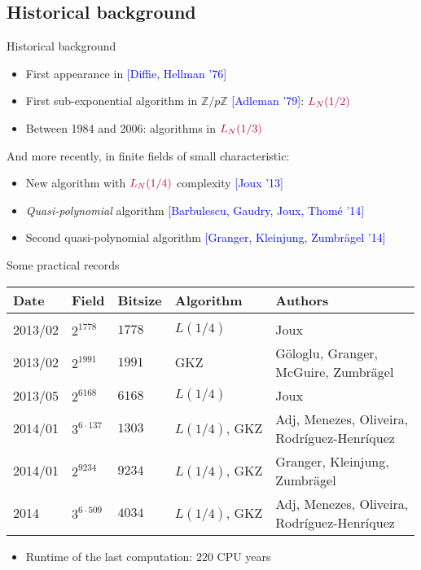 \documentclass[xcolor=x11names,compress]{beamer}
\theoremstyle{break}
\theoremstyle{sc}
\theoremstyle{definition}
\theoremstyle{remark}
\begin{document}
\subsection{Historical background}
\begin{frame}{Historical background}
  \begin{itemize}
    \item First appearance in \textcolor{blue}{[Diffie, Hellman '76]}
    \item First sub-exponential algorithm in $\mathbb{Z}/p\mathbb{Z}$ \textcolor{blue}{[Adleman '79]}:
      $\textcolor{purple}{L_N(1/2)}$
    \item Between 1984 and 2006: algorithms in $\textcolor{purple}{L_N(1/3)}$
\end{itemize}
 And more recently, in finite fields of small characteristic:
  \begin{itemize}
    \item New algorithm with $\textcolor{purple}{L_N(1/4)}$ complexity
      \textcolor{blue}{[Joux '13]}
    \item \emph{Quasi-polynomial} algorithm \textcolor{blue}{[Barbulescu,
      Gaudry, Joux, Thomé '14]}
    \item Second quasi-polynomial algorithm \textcolor{blue}{[Granger,
      Kleinjung, Zumbrägel '14]}
  \end{itemize}
\end{frame}
\begin{frame}{Some practical records}
  \begin{tabular}[here]{lllll}
    Date & Field & Bitsize & Algorithm & Authors \\
    \hline
    & & & & \\
    2013/02 & $2^{1778}$ & $1778$ & $L(1/4)$ & Joux \\
    2013/02 & $2^{1991}$ & $1991$ & GKZ & \makecell[lc]{Göloglu, Granger, \\ McGuire,
    Zumbrägel} \\
    2013/05 & $2^{6168}$ & $6168$ & $L(1/4)$ & Joux \\
    2014/01 & $3^{6\cdot137}$ & $1303$ & $L(1/4)$, GKZ & \makecell[lc]{Adj,
    Menezes, Oliveira, \\ Rodr\'iguez-Henr\'iquez}\\
    2014/01 & $2^{9234}$ & $9234$ & $L(1/4)$, GKZ & \makecell[lc]{Granger,
    Kleinjung,\\Zumbrägel}\\
    2014 & $3^{6\cdot509}$ & $4034$ & $L(1/4)$, GKZ & \makecell[lc]{Adj,
    Menezes, Oliveira, \\ Rodr\'iguez-Henr\'iquez}\\
  \end{tabular}
  \begin{itemize}
    \item Runtime of the last computation: $220$ CPU years 
  \end{itemize}
\end{frame}
\end{document}
